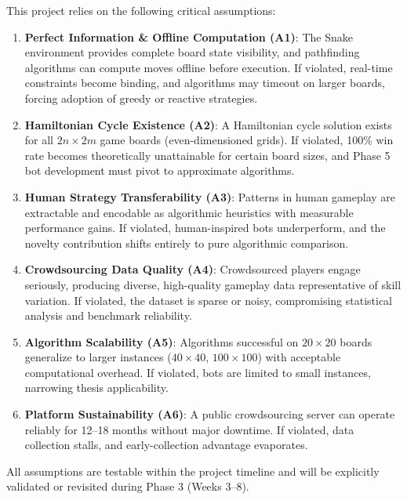 \documentclass[11pt,a4paper]{article}
\begin{document}
This project relies on the following critical assumptions:

\begin{enumerate}
    \item \textbf{Perfect Information \& Offline Computation (A1)}: The Snake environment provides complete board state visibility, and pathfinding algorithms can compute moves offline before execution. If violated, real-time constraints become binding, and algorithms may timeout on larger boards, forcing adoption of greedy or reactive strategies.
    
    \item \textbf{Hamiltonian Cycle Existence (A2)}: A Hamiltonian cycle solution exists for all $2n \times 2m$ game boards (even-dimensioned grids). If violated, 100\% win rate becomes theoretically unattainable for certain board sizes, and Phase 5 bot development must pivot to approximate algorithms.
    
    \item \textbf{Human Strategy Transferability (A3)}: Patterns in human gameplay are extractable and encodable as algorithmic heuristics with measurable performance gains. If violated, human-inspired bots underperform, and the novelty contribution shifts entirely to pure algorithmic comparison.
    
    \item \textbf{Crowdsourcing Data Quality (A4)}: Crowdsourced players engage seriously, producing diverse, high-quality gameplay data representative of skill variation. If violated, the dataset is sparse or noisy, compromising statistical analysis and benchmark reliability.
    
    \item \textbf{Algorithm Scalability (A5)}: Algorithms successful on $20 \times 20$ boards generalize to larger instances ($40 \times 40$, $100 \times 100$) with acceptable computational overhead. If violated, bots are limited to small instances, narrowing thesis applicability.
    
    \item \textbf{Platform Sustainability (A6)}: A public crowdsourcing server can operate reliably for 12--18 months without major downtime. If violated, data collection stalls, and early-collection advantage evaporates.
\end{enumerate}

All assumptions are testable within the project timeline and will be explicitly validated or revisited during Phase 3 (Weeks 3--8).
\end{document}
